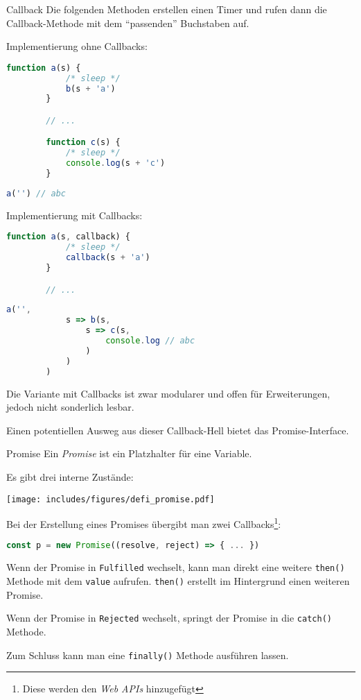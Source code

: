 \begin{example}{Callback}
    Die folgenden Methoden erstellen einen Timer und rufen dann die Callback-Methode mit dem \enquote{passenden} Buchstaben auf.

    Implementierung ohne Callbacks:
    \begin{lstlisting}[language=JavaScript]
        function a(s) {
            /* sleep */
            b(s + 'a')
        }

        // ...

        function c(s) {
            /* sleep */
            console.log(s + 'c')
        }
    \end{lstlisting}

    \begin{lstlisting}[language=JavaScript]
        a('') // abc
    \end{lstlisting}

    Implementierung mit Callbacks:
    \begin{lstlisting}[language=JavaScript]
        function a(s, callback) {
            /* sleep */
            callback(s + 'a')
        }

        // ...
    \end{lstlisting}

    \begin{lstlisting}[language=JavaScript]
        a('',
            s => b(s,
                s => c(s, 
                    console.log // abc
                )
            )
        )
    \end{lstlisting}

    Die Variante mit Callbacks ist zwar modularer und offen für Erweiterungen, jedoch nicht sonderlich lesbar.

    Einen potentiellen Ausweg aus dieser Callback-Hell bietet das Promise-Interface.
\end{example}

\begin{defi}{Promise}
    Ein \emph{Promise} ist ein Platzhalter für eine Variable.

    Es gibt drei interne Zustände:

    \begin{center}
        \texttt{[image: includes/figures/defi\_promise.pdf]}
    \end{center}

    Bei der Erstellung eines Promises übergibt man zwei Callbacks\footnote{Diese werden den \emph{Web APIs} hinzugefügt}:
    \begin{lstlisting}[language=JavaScript]
        const p = new Promise((resolve, reject) => { ... })
    \end{lstlisting}

    Wenn der Promise in \texttt{Fulfilled} wechselt, kann man direkt eine weitere \texttt{then()} Methode mit dem \texttt{value} aufrufen.
    \texttt{then()} erstellt im Hintergrund einen weiteren Promise.

    Wenn der Promise in \texttt{Rejected} wechselt, springt der Promise in die \texttt{catch()} Methode.

    Zum Schluss kann man eine \texttt{finally()} Methode ausführen lassen.
\end{defi}

